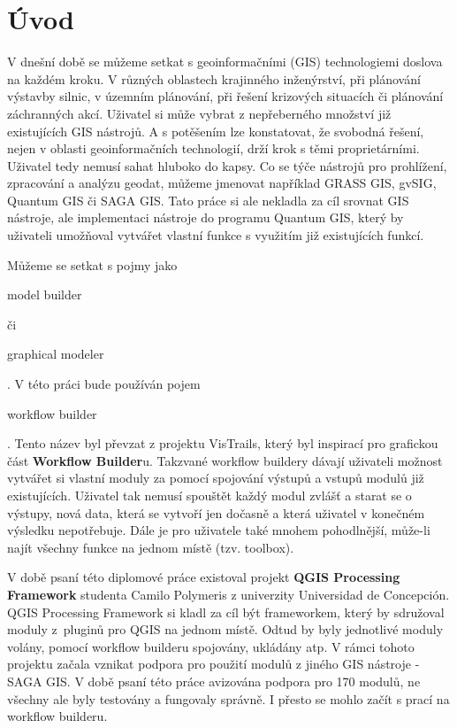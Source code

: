 \chapter*{Úvod}

V dnešní době se můžeme setkat s  geoinformačními (GIS) technologiemi doslova na každém kroku. V různých oblastech krajinného inženýrství, při plánování výstavby silnic, v územním plánování, při řešení krizových situacích či plánování záchranných akcí. Uživatel si může vybrat z nepřeberného množství již existujících GIS nástrojů. A s potěšením lze konstatovat, že svobodná řešení, nejen v oblasti geoinformačních technologií, drží krok s těmi proprietárními. Uživatel tedy nemusí sahat hluboko do kapsy. Co se týče nástrojů pro prohlížení, zpracování a analýzu  geodat, můžeme jmenovat například GRASS GIS, gvSIG, Quantum GIS či SAGA GIS. Tato práce si ale nekladla za cíl srovnat GIS nástroje, ale implementaci nástroje do programu Quantum GIS, který by uživateli umožňoval vytvářet vlastní funkce s využitím již existujících funkcí.

Můžeme se setkat s pojmy jako \begin{scriptsize}model builder\end{scriptsize} či \begin{scriptsize}graphical modeler\end{scriptsize}. V této práci bude používán pojem \begin{scriptsize}workflow builder\end{scriptsize}. Tento název byl převzat z projektu  VisTrails, který byl inspirací pro grafickou část \textbf{Workflow Builder}u. Takzvané workflow buildery dávají uživateli možnost vytvářet si vlastní moduly za pomocí spojování výstupů a vstupů modulů již existujících. Uživatel tak nemusí spouštět každý modul zvlášť a starat se o výstupy, nová data, která se vytvoří jen dočasně a která uživatel v konečném výsledku nepotřebuje. Dále je pro uživatele také mnohem pohodlnější, může-li najít všechny funkce na jednom místě (tzv. toolbox).%

V době psaní této diplomové práce existoval projekt  \textbf{QGIS Processing Framework} studenta Camilo Polymeris z univerzity Universidad de Concepción. QGIS Processing Framework si kladl za cíl být frameworkem, který by sdružoval moduly z~pluginů pro QGIS na jednom místě. Odtud by byly jednotlivé moduly volány, pomocí workflow builderu spojovány, ukládány atp. V rámci tohoto projektu začala vznikat podpora pro použití modulů z jiného GIS nástroje -  SAGA GIS. V době psaní této práce avizována podpora pro 170 modulů, ne všechny ale byly testovány a fungovaly správně. I přesto se mohlo začít s prací na workflow builderu.


